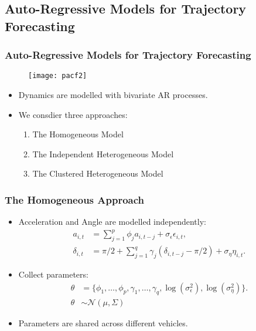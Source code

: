 \documentclass[11pt]{beamer}\usepackage[]{graphicx}\usepackage[]{color}
\begin{document}
\subsection{Auto-Regressive Models for Trajectory Forecasting}

\begin{frame}
\frametitle{Auto-Regressive Models for Trajectory Forecasting}
\begin{figure}
\centering
\texttt{[image: pacf2]}
\end{figure}
\begin{itemize}
\item Dynamics are modelled with bivariate AR processes.
\pause
\item We consdier three approaches:
\begin{enumerate}
\item The Homogeneous Model
\item The Independent Heterogeneous Model
\item The Clustered Heterogeneous Model
\end{enumerate}
\end{itemize}
\end{frame}

\begin{frame}
\frametitle{The Homogeneous Approach}
\begin{itemize}
\item Acceleration and Angle are modelled independently:
\begin{align}
a_{i, t} &= \sum_{j = 1}^p \phi_{j} a_{i, t-j} + \sigma_{\epsilon} \epsilon_{i, t}, \label{aAR} \\
\delta_{i, t} &= \pi/2 + \sum_{j = 1}^q \gamma_{j} (\delta_{i, t-j} - \pi/2) + \sigma_{\eta} \eta_{i, t}. \label{dAR} 
\end{align}
\pause
\item Collect parameters:
\begin{align}
\theta &= \{\phi_{1}, \dots, \phi_{p}, \gamma_{1}, \dots, \gamma_{q}, \log(\sigma^{2}_{\epsilon}), \log(\sigma^{2}_{\eta})\}. \label{thetaVec} \\
\theta &\sim \mathcal{N}\left(\mu, \Sigma \right) \label{indPrior} 
\end{align}
\item Parameters are shared across different vehicles.
\end{itemize}
\end{frame}
\end{document}
